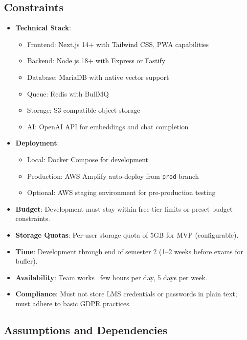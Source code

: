 \documentclass[12pt,a4paper]{article}
\begin{document}
\subsection{Constraints}

\begin{itemize}
    \item \textbf{Technical Stack}: 
    \begin{itemize}
        \item Frontend: Next.js 14+ with Tailwind CSS, PWA capabilities
        \item Backend: Node.js 18+ with Express or Fastify
        \item Database: MariaDB with native vector support
        \item Queue: Redis with BullMQ
        \item Storage: S3-compatible object storage
        \item AI: OpenAI API for embeddings and chat completion
    \end{itemize}
    \item \textbf{Deployment}: 
    \begin{itemize}
        \item Local: Docker Compose for development
        \item Production: AWS Amplify auto-deploy from \texttt{prod} branch
        \item Optional: AWS staging environment for pre-production testing
    \end{itemize}
    \item \textbf{Budget}: Development must stay within free tier limits or preset budget constraints.
    \item \textbf{Storage Quotas}: Per-user storage quota of 5GB for MVP (configurable).
    \item \textbf{Time}: Development through end of semester 2 (1--2 weeks before exams for buffer).
    \item \textbf{Availability}: Team works ~few hours per day, 5 days per week.
    \item \textbf{Compliance}: Must not store LMS credentials or passwords in plain text; must adhere to basic GDPR practices.
\end{itemize}

\subsection{Assumptions and Dependencies}
\end{document}
